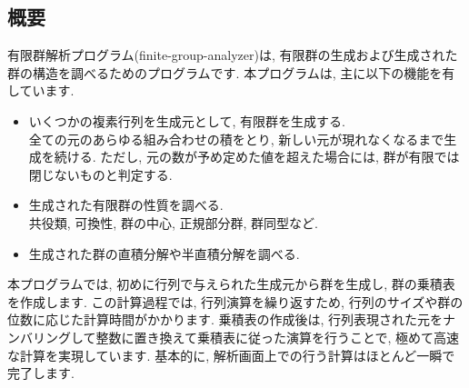 \documentclass[11pt, a4paper]{jsarticle}
\begin{document}
\subsection{概要}
有限群解析プログラム(finite-group-analyzer)は, 有限群の生成および生成された群の構造を調べるためのプログラムです.
本プログラムは, 主に以下の機能を有しています.
\begin{itemize}
\item いくつかの複素行列を生成元として, 有限群を生成する. \\
全ての元のあらゆる組み合わせの積をとり, 新しい元が現れなくなるまで生成を続ける.
ただし, 元の数が予め定めた値を超えた場合には, 群が有限では閉じないものと判定する.
\item 生成された有限群の性質を調べる. \\
共役類, 可換性, 群の中心, 正規部分群, 群同型など.
\item 生成された群の直積分解や半直積分解を調べる.
\end{itemize}
本プログラムでは, 初めに行列で与えられた生成元から群を生成し, 群の乗積表を作成します.
この計算過程では, 行列演算を繰り返すため, 行列のサイズや群の位数に応じた計算時間がかかります.
乗積表の作成後は, 行列表現された元をナンバリングして整数に置き換えて乗積表に従った演算を行うことで, 極めて高速な計算を実現しています.
基本的に, 解析画面上での行う計算はほとんど一瞬で完了します.
\end{document}
